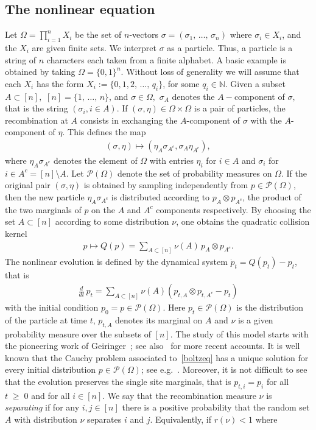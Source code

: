\documentclass[10pt,a4paper]{amsart}
\renewcommand{\geq}{\;\geqslant\;}
\newcommand{\si}{\sigma}
\newcommand{\cP}{\mathcal{P}}
\newcommand{\bbN}{\mathbb{N}}
\let\O=\Omega
\theoremstyle{definition}
\theoremstyle{plain}
\numberwithin{equation}{section}
\begin{document}
\subsection{The nonlinear equation}\label{setup}
Let $\Omega = \prod_{i=1}^nX_i$ be the set of $n$-vectors $\sigma = (\sigma_1,\,\dots,\,\sigma_n)$ where $\si_i\in X_i$, and the $X_i$ are given finite sets. We interpret $\si$ as a particle. Thus, a particle is a string of $n$ characters each taken from a finite alphabet. A basic example is obtained by taking $\Omega=\{0,1\}^n$. Without loss of generality we will assume that each $X_i$ has the form $X_i :=\{0,1,2,\,\dots,\,q_i\}$, for some $q_i \in \bbN$. Given a subset $A \subset [n],$ $[n]=\{1,\,\dots,\,n\}$, and $\sigma \in \Omega,$ $\sigma_A$ denotes the $A-$component of $\sigma,$ that is the string $(\sigma_i, i \in A).$ If $(\sigma, \eta) \in \Omega \times \Omega$ is a pair of particles, the recombination at $A$ consists in exchanging the $A$-component of $\sigma$ with the $A$-component of $\eta.$ This defines the map
\begin{align*}
(\sigma,\eta) \mapsto (\eta_A\sigma_{A^c},\sigma_A\eta_{A^c}),
\end{align*}
where $\eta_A\sigma_{A^c}$ denotes the element of $\Omega$ with entries $\eta_i$ for $i \in A$ and $\sigma_i$ for $i \in A^c=[n]\setminus A.$ Let $\cP(\O)$ denote the set of probability measures on $\O$. If the original pair $(\si,\eta)$ is obtained by sampling independently from $p\in\cP(\O)$, then the new particle $\eta_A\si_{A^c}$ is distributed according to $p_A\otimes p_{A^c}$, the product of the two marginals of $p$ on the $A$ and $A^c$ components respectively. By choosing the set $A\subset[n]$ according to some distribution $\nu$, one obtains the quadratic collision kernel
\begin{align*}
p\mapsto Q(p) = \sum_{A \subset [n]}\nu(A)\,p_{A}\otimes p_{A^c}.
\end{align*}
The nonlinear evolution is defined by the dynamical system $\dot{p}_t = Q(p_t) - p_t$, that is
\begin{align}\label{boltzeq}
\frac{d}{dt}\,p_t = \sum_{A \subset [n]}\nu(A)\left(p_{t,A}\otimes p_{t,A^c} - p_t\right)
\end{align}
with the initial condition $p_0=p\in\cP(\O)$. Here $p_t\in\cP(\O)$ is the distribution of the particle at time $t$, $p_{t,A}$ denotes its marginal on $A$ and $\nu$ is a given probability measure over the subsets of $[n]$. The study of this model starts with the pioneering work of Geiringer~\cite{Gei}; see also~\cite{Martinez,Sinetal,Sinetal2,Baakeetal} for more recent accounts. It is well known that the Cauchy problem associated to~\eqref{boltzeq} has a unique solution for every initial distribution $p\in\cP(\O)$; see e.g.~\cite{Baakeetal}. Moreover, it is not difficult to see that the evolution preserves the single site marginals, that is $p_{t,i}=p_{i}$ for all $t\geq 0$ and for all $i\in[n]$. We say that the recombination measure $\nu$ is \emph{separating} if for any $i, j \in [n]$ there is a positive probability that the random set $A$ with distribution $\nu$ separates $i$ and $j$. Equivalently, if $r(\nu)<1$ where
\end{document}
